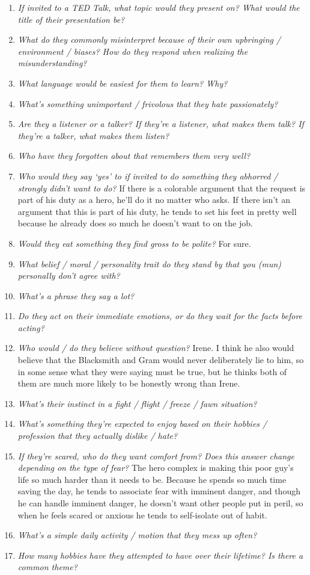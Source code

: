 \begin{enumerate}
    \item\textit{If invited to a TED Talk, what topic would they present on? What would the title of their presentation be?}
    \item\textit{What do they commonly misinterpret because of their own upbringing / environment / biases? How do they respond when realizing the misunderstanding?}
    \item\textit{What language would be easiest for them to learn? Why?}
    \item\textit{What’s something unimportant / frivolous that they hate passionately?} 
    \item\textit{Are they a listener or a talker? If they’re a listener, what makes them talk? If they’re a talker, what makes them listen?}
    \item\textit{Who have they forgotten about that remembers them very well?}
    \item\textit{Who would they say ‘yes’ to if invited to do something they abhorred / strongly didn’t want to do?} If there is a colorable argument that the request is part of his duty as a hero, he'll do it no matter who asks. If there isn't an argument that this is part of his duty, he tends to set his feet in pretty well because he already does so much he doesn't want to on the job.
    \item\textit{Would they eat something they find gross to be polite?} For sure.
    \item\textit{What belief / moral / personality trait do they stand by that you (mun) personally don’t agree with?}
    \item\textit{What’s a phrase they say a lot?}
    \item\textit{Do they act on their immediate emotions, or do they wait for the facts before acting?}
    \item\textit{Who would / do they believe without question?} Irene. I think he also would believe that the Blacksmith and Gram would never deliberately lie to him, so in some sense what they were saying must be true, but he thinks both of them are much more likely to be honestly wrong than Irene.
    \item\textit{What’s their instinct in a fight / flight / freeze / fawn situation?} 
    \item\textit{What’s something they’re expected to enjoy based on their hobbies / profession that they actually dislike / hate?}
    \item\textit{If they’re scared, who do they want comfort from? Does this answer change depending on the type of fear?} The hero complex is making this poor guy's life so much harder than it needs to be. Because he spends so much time saving the day, he tends to associate fear with imminent danger, and though he can handle imminent danger, he doesn't want other people put in peril, so when he feels scared or anxious he tends to self-isolate out of habit. 
    \item\textit{What’s a simple daily activity / motion that they mess up often?}
    \item\textit{How many hobbies have they attempted to have over their lifetime? Is there a common theme?}
  \end{enumerate}